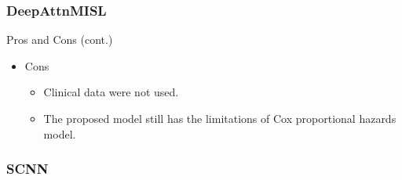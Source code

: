 \documentclass{beamer}
\begin{document}
	\begin{frame}
		\frametitle{DeepAttnMISL}
		Pros and Cons (cont.)
		\begin{itemize}
			\item Cons
			\begin{itemize}
				\item Clinical data were not used.
				\item The proposed model still has the limitations of Cox proportional hazards model.
			\end{itemize}
		\end{itemize}
	\end{frame}
	
	\begin{frame}
		\frametitle{SCNN}
		
	\end{frame}

	\begin{frame}[allowframebreaks]
		\begin{singlespace}
			
			
		\end{singlespace}
	\end{frame}
	
\end{document}
